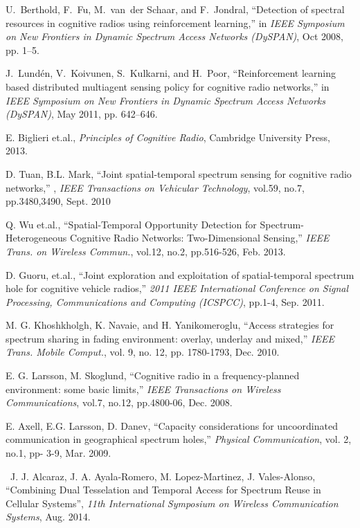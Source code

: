 \begin{thebibliography}{1}
U.~Berthold, F.~Fu, M.~van~der Schaar, and F.~Jondral, ``Detection of spectral
  resources in cognitive radios using reinforcement learning,'' in \emph{{IEEE}
  Symposium on New Frontiers in Dynamic Spectrum Access Networks {(DySPAN)}},
  Oct 2008, pp. 1--5.

J.~Lund\'en, V.~Koivunen, S.~Kulkarni, and H.~Poor, ``Reinforcement learning
  based distributed multiagent sensing policy for cognitive radio networks,''
  in \emph{{IEEE} Symposium on New Frontiers in Dynamic Spectrum Access
  Networks {(DySPAN)}}, May 2011, pp. 642--646.







 E. Biglieri et.al., \emph{Principles of Cognitive Radio}, Cambridge University Press, 2013.

 D. Tuan, B.L. Mark, ``Joint spatial-temporal spectrum sensing for cognitive radio networks,'' , \emph{IEEE Transactions on Vehicular Technology}, vol.59, no.7, pp.3480,3490, Sept. 2010

 Q. Wu et.al., ``Spatial-Temporal Opportunity Detection for Spectrum-Heterogeneous Cognitive Radio Networks: Two-Dimensional Sensing,'' \emph{IEEE Trans. on Wireless Commun.}, vol.12, no.2, pp.516-526, Feb. 2013.

 D. Guoru, et.al., ``Joint exploration and exploitation of spatial-temporal spectrum hole for cognitive vehicle radios,'' \emph{2011 IEEE International Conference on Signal Processing, Communications and Computing (ICSPCC)}, pp.1-4, Sep. 2011.

  M. G. Khoshkholgh, K. Navaie, and H. Yanikomeroglu, ``Access strategies for spectrum sharing in fading environment: overlay, underlay and mixed,'' \emph{IEEE Trans. Mobile Comput.}, vol. 9, no. 12, pp. 1780-1793, Dec. 2010.

 E. G. Larsson, M. Skoglund, ``Cognitive radio in a frequency-planned environment: some basic limits,'' \emph{IEEE Transactions on Wireless Communications}, vol.7, no.12, pp.4800-06, Dec. 2008.

 E. Axell, E.G. Larsson, D. Danev, ``Capacity considerations for uncoordinated communication in geographical spectrum holes,'' \emph{Physical Communication}, vol. 2, no.1, pp- 3-9, Mar. 2009.

 J. J. Alcaraz, J. A. Ayala-Romero, M. Lopez-Martinez, J. Vales-Alonso, ``Combining Dual Tesselation and Temporal Access for Spectrum Reuse in Cellular Systems'', \emph{11th International Symposium on Wireless Communication Systems}, Aug. 2014.


\end{thebibliography}
